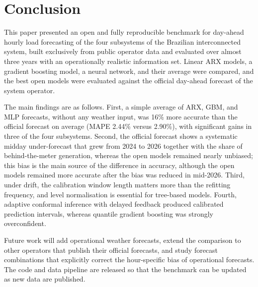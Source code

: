 \section{Conclusion}
\label{sec:conclusion}
This paper presented an open and fully reproducible benchmark for day-ahead hourly load forecasting of the four subsystems of the Brazilian interconnected system, built exclusively from public operator data and evaluated over almost three years with an operationally realistic information set. Linear ARX models, a gradient boosting model, a neural network, and their average were compared, and the best open models were evaluated against the official day-ahead forecast of the system operator.

The main findings are as follows. First, a simple average of ARX, GBM, and MLP forecasts, without any weather input, was 16\% more accurate than the official forecast on average (MAPE 2.44\% versus 2.90\%), with significant gains in three of the four subsystems. Second, the official forecast shows a systematic midday under-forecast that grew from 2024 to 2026 together with the share of behind-the-meter generation, whereas the open models remained nearly unbiased; this bias is the main source of the difference in accuracy, although the open models remained more accurate after the bias was reduced in mid-2026. Third, under drift, the calibration window length matters more than the refitting frequency, and level normalisation is essential for tree-based models. Fourth, adaptive conformal inference with delayed feedback produced calibrated prediction intervals, whereas quantile gradient boosting was strongly overconfident.

Future work will add operational weather forecasts, extend the comparison to other operators that publish their official forecasts, and study forecast combinations that explicitly correct the hour-specific bias of operational forecasts. The code and data pipeline are released so that the benchmark can be updated as new data are published.
